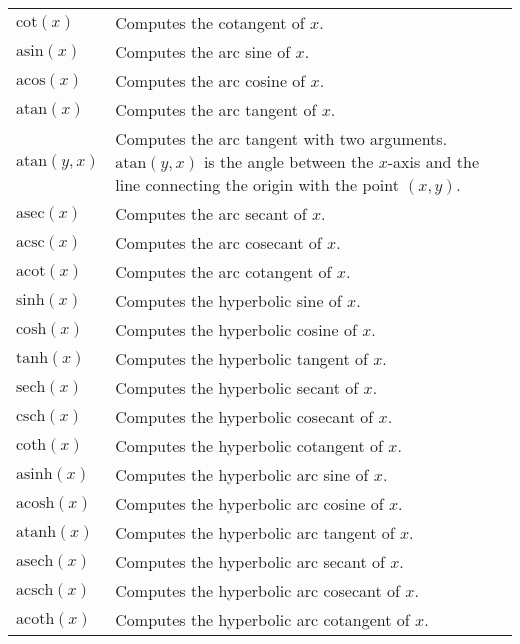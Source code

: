 \documentclass[10pt]{article}
\begin{document}
\begin{longtable}{p{}p{}}
        $ \mathrm{cot}(x) $                        & Computes the cotangent of $ x $. \\
        $ \mathrm{asin}(x) $                       & Computes the arc sine of $ x $. \\
        $ \mathrm{acos}(x) $                       & Computes the arc cosine of $ x $. \\
        $ \mathrm{atan}(x) $                       & Computes the arc tangent of $ x $. \\
        $ \mathrm{atan}(y, x) $                    & Computes the arc tangent with two arguments. $ \mathrm{atan}(y, x) $ is the angle between the $ x $-axis and the line connecting the origin with the point $ (x, y) $. \\
        $ \mathrm{asec}(x) $                       & Computes the arc secant of $ x $. \\
        $ \mathrm{acsc}(x) $                       & Computes the arc cosecant of $ x $. \\
        $ \mathrm{acot}(x) $                       & Computes the arc cotangent of $ x $. \\
        $ \mathrm{sinh}(x) $                       & Computes the hyperbolic sine of $ x $. \\
        $ \mathrm{cosh}(x) $                       & Computes the hyperbolic cosine of $ x $. \\
        $ \mathrm{tanh}(x) $                       & Computes the hyperbolic tangent of $ x $. \\
        $ \mathrm{sech}(x) $                       & Computes the hyperbolic secant of $ x $. \\
        $ \mathrm{csch}(x) $                       & Computes the hyperbolic cosecant of $ x $. \\
        $ \mathrm{coth}(x) $                       & Computes the hyperbolic cotangent of $ x $. \\
        $ \mathrm{asinh}(x) $                      & Computes the hyperbolic arc sine of $ x $. \\
        $ \mathrm{acosh}(x) $                      & Computes the hyperbolic arc cosine of $ x $. \\
        $ \mathrm{atanh}(x) $                      & Computes the hyperbolic arc tangent of $ x $. \\
        $ \mathrm{asech}(x) $                      & Computes the hyperbolic arc secant of $ x $. \\
        $ \mathrm{acsch}(x) $                      & Computes the hyperbolic arc cosecant of $ x $. \\
        $ \mathrm{acoth}(x) $                      & Computes the hyperbolic arc cotangent of $ x $. \\
    \end{longtable}
    
\end{document}
